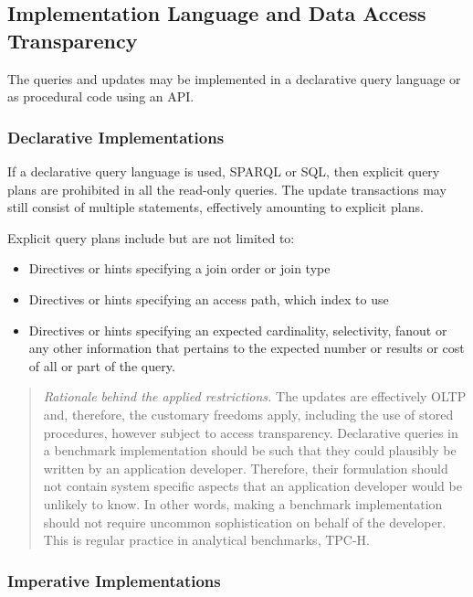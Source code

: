 \subsection{Implementation Language and Data Access Transparency}

The queries and updates may be implemented in a declarative query language or as procedural code using an API.

\subsubsection{Declarative Implementations}
\label{sec:snb-declarative-implementations}

If a declarative query language is used, \eg SPARQL or SQL, then explicit query plans are prohibited in all the read-only queries. The update transactions may still consist of multiple statements, effectively amounting to explicit plans.

Explicit query plans include but are not limited to:
\begin{itemize}
    \item Directives or hints specifying a join order or join type
    \item Directives or hints specifying an access path, \eg which index to use
    \item Directives or hints specifying an expected cardinality, selectivity, fanout or any other information that pertains to the expected number or results or cost of all or part of the query.
\end{itemize}

\begin{quote}
    \emph{Rationale behind the applied restrictions.} The updates are effectively OLTP and, therefore, the customary freedoms apply, including the use of stored procedures, however subject to access transparency. Declarative queries in a benchmark implementation should be such that they could plausibly be written by an application developer. Therefore, their formulation should not contain system specific aspects that an application developer would be unlikely to know. In other words, making a benchmark implementation should not require uncommon sophistication on behalf of the developer. This is regular practice in analytical benchmarks, \eg TPC-H.
\end{quote}

\subsubsection{Imperative Implementations}

